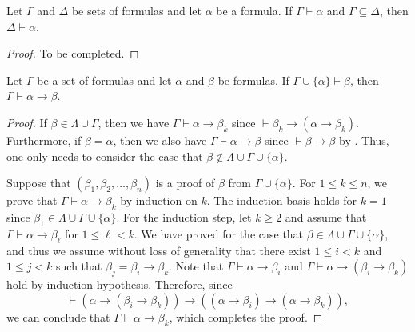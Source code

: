 \begin{proposition}
  Let $\Gamma$ and $\Delta$ be sets of formulas and let $\alpha$ be a formula.
  If $\Gamma \vdash \alpha$ and $\Gamma \subseteq \Delta$, then
  $\Delta \vdash \alpha$.
\end{proposition}
\begin{proof}
  To be completed.
\end{proof}

\begin{theorem}
  \label{thm:deduction}
  Let $\Gamma$ be a set of formulas and let $\alpha$ and $\beta$ be formulas.
  If $\Gamma \cup \{\alpha\} \vdash \beta$, then
  $\Gamma \vdash \alpha \to \beta$.
\end{theorem}
\begin{proof}
  If $\beta \in \Lambda \cup \Gamma$, then we have
  $\Gamma \vdash \alpha \to \beta_k$ since
  $\vdash \beta_k \to (\alpha \to \beta_k)$.
  Furthermore, if $\beta = \alpha$, then we also have
  $\Gamma \vdash \alpha \to \beta$ since $\vdash \beta \to \beta$ by
  .
  Thus, one only needs to consider the case that
  $\beta \notin \Lambda \cup \Gamma \cup \{\alpha\}$.

  Suppose that $(\beta_1, \beta_2, \dots, \beta_n)$ is a proof of $\beta$ from
  $\Gamma \cup \{\alpha\}$.
  For $1 \leq k \leq n$, we prove that $\Gamma \vdash \alpha \to \beta_k$ by
  induction on $k$.
  The induction basis holds for $k = 1$ since
  $\beta_1 \in \Lambda \cup \Gamma \cup \{\alpha\}$.
  For the induction step, let $k \geq 2$ and assume that
  $\Gamma \vdash \alpha \to \beta_\ell$ for $1 \leq \ell < k$.
  We have proved for the case that
  $\beta \in \Lambda \cup \Gamma \cup \{\alpha\}$, and thus we assume without
  loss of generality that there exist $1 \leq i < k$ and $1 \leq j < k$
  such that $\beta_j = \beta_i \to \beta_k$.
  Note that $\Gamma \vdash \alpha \to \beta_i$ and
  $\Gamma \vdash \alpha \to (\beta_i \to \beta_k)$
  hold by induction hypothesis.
  Therefore, since
  \begin{equation*}
    \vdash (\alpha \to (\beta_i \to \beta_k)) \to
    ((\alpha \to \beta_i) \to (\alpha \to \beta_k)),
  \end{equation*}
  we can conclude that $\Gamma \vdash \alpha \to \beta_k$,
  which completes the proof.
\end{proof}

